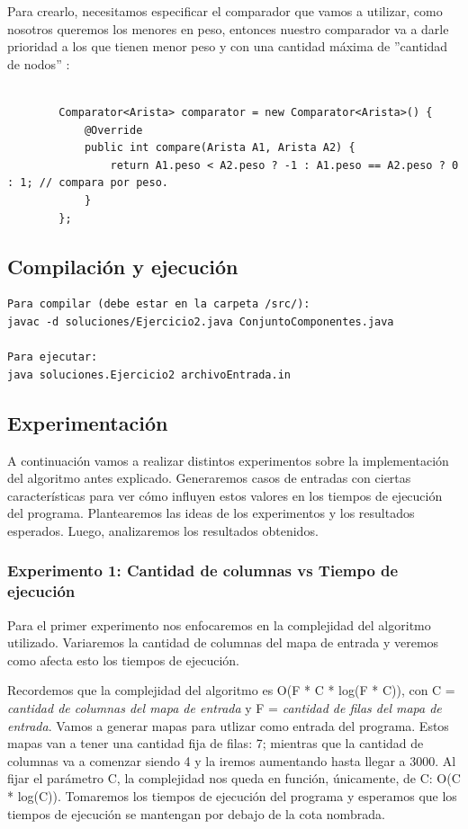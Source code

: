     
Para crearlo, necesitamos especificar el comparador que vamos a utilizar, como nosotros queremos los menores en peso, entonces nuestro comparador va a darle prioridad a los que tienen menor peso y con una cantidad máxima de ''cantidad de nodos'' :
	\begin{lstlisting}
		
		Comparator<Arista> comparator = new Comparator<Arista>() {
			@Override
			public int compare(Arista A1, Arista A2) {
				return A1.peso < A2.peso ? -1 : A1.peso == A2.peso ? 0 : 1; // compara por peso.
			}
		};
	\end{lstlisting}

\subsection{Compilación y ejecución}
\begin{verbatim}
Para compilar (debe estar en la carpeta /src/):
javac -d soluciones/Ejercicio2.java ConjuntoComponentes.java

Para ejecutar:
java soluciones.Ejercicio2 archivoEntrada.in
\end{verbatim}

\subsection{Experimentación}

\par A continuación vamos a realizar distintos experimentos sobre la implementación del algoritmo antes explicado. Generaremos casos de entradas con ciertas características para ver cómo influyen estos valores en los tiempos de ejecución del programa. Plantearemos las ideas de los experimentos y los resultados esperados. Luego, analizaremos los resultados obtenidos.

\subsubsection{Experimento 1: Cantidad de columnas vs Tiempo de ejecución}

\par Para el primer experimento nos enfocaremos en la complejidad del algoritmo utilizado. Variaremos la cantidad de columnas del mapa de entrada y veremos como afecta esto los tiempos de ejecución.

\par Recordemos que la complejidad del algoritmo es O(F * C * log(F * C)), con C = \textit{cantidad de columnas del mapa de entrada} y F = \textit{cantidad de filas del mapa de entrada}. Vamos a generar mapas para utlizar como entrada del programa. Estos mapas van a tener una cantidad fija de filas: 7; mientras que la cantidad de columnas va a comenzar siendo 4 y la iremos aumentando hasta llegar a 3000. Al fijar el parámetro C, la complejidad nos queda en función, únicamente, de C: O(C * log(C)). Tomaremos los tiempos de ejecución del programa y esperamos que los tiempos de ejecución se mantengan por debajo de la cota nombrada.


